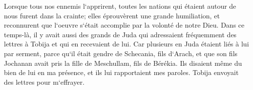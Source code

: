 \verse Lorsque tous nos ennemis l`apprirent, toutes les nations qui étaient autour de nous furent dans la crainte; elles éprouvèrent une grande humiliation, et reconnurent que l`oeuvre s`était accomplie par la volonté de notre Dieu. 
\verse Dans ce temps-là, il y avait aussi des grands de Juda qui adressaient fréquemment des lettres à Tobija et qui en recevaient de lui. 
\verse Car plusieurs en Juda étaient liés à lui par serment, parce qu`il était gendre de Schecania, fils d`Arach, et que son fils Jochanan avait pris la fille de Meschullam, fils de Bérékia. 
\verse Ils disaient même du bien de lui en ma présence, et ils lui rapportaient mes paroles. Tobija envoyait des lettres pour m`effrayer. 

\chapter{}

